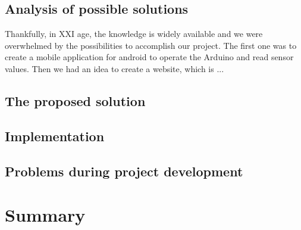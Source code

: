 \documentclass[oneside,a4paper,11pt]{report}
\begin{document}
\section{Analysis of possible solutions}
Thankfully, in XXI age, the knowledge is widely available and we were overwhelmed by the possibilities to accomplish our project. The first one was to create a mobile application for android to operate the Arduino and read sensor values. Then we had an idea to create a website, which is ...
\section{The proposed solution} 
\section{Implementation}
\section{Problems during project development}

\chapter{Summary}



\clearpage
{}
{}


\end{document}
